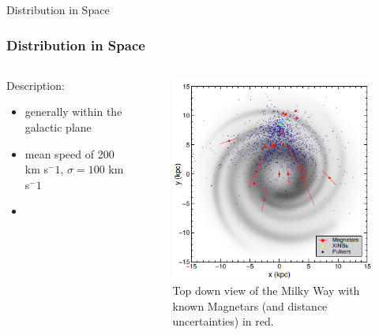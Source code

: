 \documentclass[hyperref=pdftex, presentation]{beamer}
\begin{document}
\begin{frame}{\Large Distribution in Space}
\frametitle{\Large Distribution in Space}

\begin{minipage}[0.2\textheight]{\textwidth}
\begin{columns}[T]
\begin{column}{0.5\textwidth}

\begin{block}{Description:}

\begin{itemize}
 \item<2-> generally within the galactic plane %
 \item<3-> mean speed of 200 km s$^-1$, $\sigma = 100$ km s$^-1$
 \item<4-> 
\end{itemize}
\end{block}
\end{column}
\begin{column}{0.5\textwidth}
	\begin{figure}
		\includegraphics[scale=.5]{figures/spatial.png}
		\caption{Top down view of the Milky Way with known Magnetars (and distance uncertainties) in red.}
	\end{figure}
\end{column}
\end{columns}
\end{minipage}

\end{frame}
\end{document}
